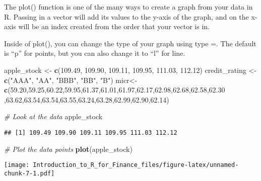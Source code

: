 \documentclass[]{article}
\newenvironment{Shaded}{\begin{snugshade}}{\end{snugshade}}
\newcommand{\KeywordTok}[1]{\textcolor[rgb]{0.13,0.29,0.53}{\textbf{#1}}}
\newcommand{\FloatTok}[1]{\textcolor[rgb]{0.00,0.00,0.81}{#1}}
\newcommand{\StringTok}[1]{\textcolor[rgb]{0.31,0.60,0.02}{#1}}
\newcommand{\CommentTok}[1]{\textcolor[rgb]{0.56,0.35,0.01}{\textit{#1}}}
\newcommand{\NormalTok}[1]{#1}
\begin{document}
The plot() function is one of the many ways to create a graph from your
data in R. Passing in a vector will add its values to the y-axis of the
graph, and on the x-axis will be an index created from the order that
your vector is in.

Inside of plot(), you can change the type of your graph using type =.
The default is ``p'' for points, but you can also change it to ``l'' for
line.

\begin{Shaded}
\begin{Highlighting}[]
\NormalTok{apple_stock <-}\StringTok{ }\KeywordTok{c}\NormalTok{(}\FloatTok{109.49}\NormalTok{, }\FloatTok{109.90}\NormalTok{, }\FloatTok{109.11}\NormalTok{, }\FloatTok{109.95}\NormalTok{, }\FloatTok{111.03}\NormalTok{, }\FloatTok{112.12}\NormalTok{)}
\NormalTok{credit_rating <-}\StringTok{ }\KeywordTok{c}\NormalTok{(}\StringTok{"AAA"}\NormalTok{, }\StringTok{"AA"}\NormalTok{, }\StringTok{"BBB"}\NormalTok{, }\StringTok{"BB"}\NormalTok{, }\StringTok{"B"}\NormalTok{)}
\NormalTok{micr<-}\KeywordTok{c}\NormalTok{(}\FloatTok{59.20}\NormalTok{,}\FloatTok{59.25}\NormalTok{,}\FloatTok{60.22}\NormalTok{,}\FloatTok{59.95}\NormalTok{,}\FloatTok{61.37}\NormalTok{,}\FloatTok{61.01}\NormalTok{,}\FloatTok{61.97}\NormalTok{,}\FloatTok{62.17}\NormalTok{,}\FloatTok{62.98}\NormalTok{,}\FloatTok{62.68}\NormalTok{,}\FloatTok{62.58}\NormalTok{,}\FloatTok{62.30}
\NormalTok{,}\FloatTok{63.62}\NormalTok{,}\FloatTok{63.54}\NormalTok{,}\FloatTok{63.54}\NormalTok{,}\FloatTok{63.55}\NormalTok{,}\FloatTok{63.24}\NormalTok{,}\FloatTok{63.28}\NormalTok{,}\FloatTok{62.99}\NormalTok{,}\FloatTok{62.90}\NormalTok{,}\FloatTok{62.14}\NormalTok{)}

\CommentTok{# Look at the data}
\NormalTok{apple_stock}
\end{Highlighting}
\end{Shaded}

\begin{verbatim}
## [1] 109.49 109.90 109.11 109.95 111.03 112.12
\end{verbatim}

\begin{Shaded}
\begin{Highlighting}[]
\CommentTok{# Plot the data points}
\KeywordTok{plot}\NormalTok{(apple_stock)}
\end{Highlighting}
\end{Shaded}

\texttt{[image: Introduction\_to\_R\_for\_Finance\_files/figure-latex/unnamed-chunk-7-1.pdf]}
\end{document}
